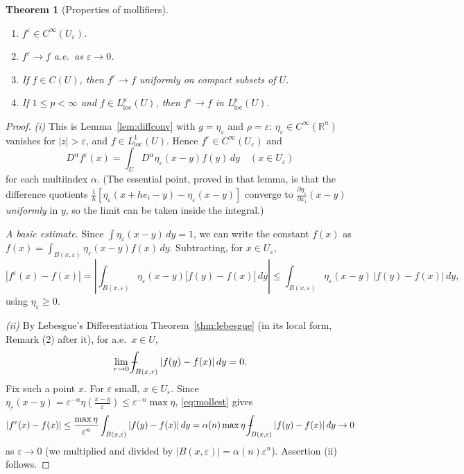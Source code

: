 \documentclass[11pt]{article}
\def\Xint#1{\mathchoice
  {\XXint\displaystyle\textstyle{#1}}%
  {\XXint\textstyle\scriptstyle{#1}}%
  {\XXint\scriptstyle\scriptscriptstyle{#1}}%
  {\XXint\scriptscriptstyle\scriptscriptstyle{#1}}%
  \!\int}
\def\XXint#1#2#3{{\setbox0=\hbox{$#1{#2#3}{\int}$}
  \vcenter{\hbox{$#2#3$}}\kern-.5\wd0}}
\def\fint{\Xint-}
\theoremstyle{plain}
\newtheorem{theorem}{Theorem}[section]
\theoremstyle{definition}
\theoremstyle{remark}
\begin{document}
\begin{theorem}[Properties of mollifiers]\label{thm:mollifiers}
\begin{enumerate}
    \item[(i)] $f^\varepsilon \in C^\infty(U_\varepsilon)$.
    \item[(ii)] $f^\varepsilon \to f$ a.e.\ as $\varepsilon \to 0$.
    \item[(iii)] If $f \in C(U)$, then $f^\varepsilon \to f$ uniformly on compact subsets of $U$.
    \item[(iv)] If $1 \le p < \infty$ and $f \in L^p_{\mathrm{loc}}(U)$, then $f^\varepsilon \to f$ in $L^p_{\mathrm{loc}}(U)$.
\end{enumerate}
\end{theorem}
\begin{proof}
\emph{(i)} This is Lemma~\ref{lem:diffconv} with $g = \eta_\varepsilon$ and $\rho = \varepsilon$: $\eta_\varepsilon \in C^\infty(\mathbb{R}^n)$ vanishes for $|z| > \varepsilon$, and $f \in L^1_{\mathrm{loc}}(U)$. Hence $f^\varepsilon \in C^\infty(U_\varepsilon)$ and
$$ D^\alpha f^\varepsilon(x) = \int_U D^\alpha \eta_\varepsilon(x - y) f(y)\, dy \quad (x \in U_\varepsilon) $$
for each multiindex $\alpha$. (The essential point, proved in that lemma, is that the difference quotients $\frac1h[\eta_\varepsilon(x + he_i - y) - \eta_\varepsilon(x-y)]$ converge to $\frac{\partial \eta_\varepsilon}{\partial x_i}(x-y)$ \emph{uniformly} in $y$, so the limit can be taken inside the integral.)

\emph{A basic estimate.} Since $\int \eta_\varepsilon(x-y)\, dy = 1$, we can write the constant $f(x)$ as $f(x) = \int_{B(x,\varepsilon)} \eta_\varepsilon(x-y) f(x)\, dy$. Subtracting, for $x \in U_\varepsilon$,
\begin{equation}\label{eq:mollest}
|f^\varepsilon(x) - f(x)| = \left| \int_{B(x,\varepsilon)} \eta_\varepsilon(x-y)\big[f(y) - f(x)\big]\, dy \right| \leq \int_{B(x,\varepsilon)} \eta_\varepsilon(x-y)\,|f(y) - f(x)|\, dy,
\end{equation}
using $\eta_\varepsilon \geq 0$.

\emph{(ii)} By Lebesgue's Differentiation Theorem~\ref{thm:lebesgue} (in its local form, Remark (2) after it), for a.e.\ $x \in U$,
$$ \lim_{r \to 0} \fint_{B(x,r)} |f(y) - f(x)|\, dy = 0. $$
Fix such a point $x$. For $\varepsilon$ small, $x \in U_\varepsilon$. Since $\eta_\varepsilon(x - y) = \varepsilon^{-n}\eta(\frac{x-y}{\varepsilon}) \leq \varepsilon^{-n}\max\eta$, \eqref{eq:mollest} gives
$$ |f^\varepsilon(x) - f(x)| \leq \frac{\max \eta}{\varepsilon^n}\int_{B(x,\varepsilon)}|f(y) - f(x)|\, dy = \alpha(n)\max\eta\, \fint_{B(x,\varepsilon)}|f(y) - f(x)|\, dy \to 0 $$
as $\varepsilon \to 0$ (we multiplied and divided by $|B(x,\varepsilon)| = \alpha(n)\varepsilon^n$). Assertion (ii) follows.


\end{proof}
\end{document}
